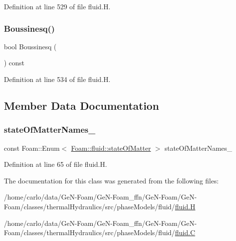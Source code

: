Definition at line 529 of file fluid.\+H.

\mbox{\label{classFoam_1_1fluid_a0d2b3b5fda2fdcfa3da8dc7327348ddd}} 
\subsubsection{\texorpdfstring{Boussinesq()}{Boussinesq()}}
{\footnotesize\ttfamily bool Boussinesq (\begin{DoxyParamCaption}{ }\end{DoxyParamCaption}) const\hspace{0.3cm}{\ttfamily [inline]}}



Definition at line 534 of file fluid.\+H.



\subsection{Member Data Documentation}
\mbox{\label{classFoam_1_1fluid_a46762458d6c9ef25d1c23c8f6f309427}} 
\subsubsection{\texorpdfstring{state\+Of\+Matter\+Names\+\_\+}{stateOfMatterNames\_}}
{\footnotesize\ttfamily const Foam\+::\+Enum$<$ \hyperlink{classFoam_1_1fluid_a78daa7f427841ffa599af97aa64f9d4f}{Foam\+::fluid\+::state\+Of\+Matter} $>$ state\+Of\+Matter\+Names\+\_\+\hspace{0.3cm}{\ttfamily [static]}}



Definition at line 65 of file fluid.\+H.



The documentation for this class was generated from the following files\+:\begin{DoxyCompactItemize}
\item 
/home/carlo/data/\+Ge\+N-\/\+Foam/\+Ge\+N-\/\+Foam\+\_\+ffn/\+Ge\+N-\/\+Foam/\+Ge\+N-\/\+Foam/classes/thermal\+Hydraulics/src/phase\+Models/fluid/\hyperlink{fluid_8H}{fluid.\+H}\item 
/home/carlo/data/\+Ge\+N-\/\+Foam/\+Ge\+N-\/\+Foam\+\_\+ffn/\+Ge\+N-\/\+Foam/\+Ge\+N-\/\+Foam/classes/thermal\+Hydraulics/src/phase\+Models/fluid/\hyperlink{fluid_8C}{fluid.\+C}\end{DoxyCompactItemize}
